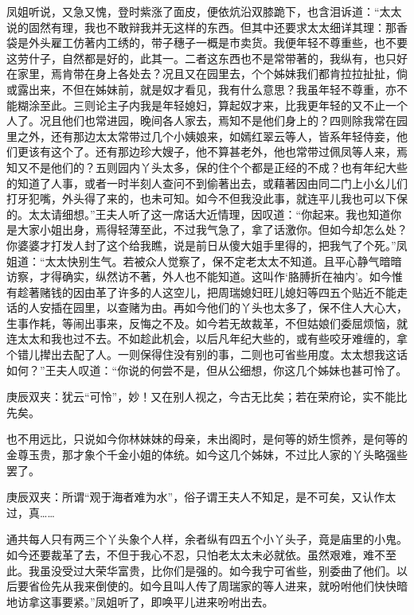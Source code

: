 \begin{parag}
    凤姐听说，又急又愧，登时紫涨了面皮，便依炕沿双膝跪下，也含泪诉道：“太太说的固然有理，我也不敢辩我并无这样的东西。但其中还要求太太细详其理：那香袋是外头雇工仿著内工绣的，带子穗子一概是市卖货。我便年轻不尊重些，也不要这劳什子，自然都是好的，此其一。二者这东西也不是常带著的，我纵有，也只好在家里，焉肯带在身上各处去？况且又在园里去，个个姊妹我们都肯拉拉扯扯，倘或露出来，不但在姊妹前，就是奴才看见，我有什么意思？我虽年轻不尊重，亦不能糊涂至此。三则论主子内我是年轻媳妇，算起奴才来，比我更年轻的又不止一个人了。况且他们也常进园，晚间各人家去，焉知不是他们身上的？四则除我常在园里之外，还有那边太太常带过几个小姨娘来，如嫣红翠云等人，皆系年轻侍妾，他们更该有这个了。还有那边珍大嫂子，他不算甚老外，他也常带过佩凤等人来，焉知又不是他们的？五则园内丫头太多，保的住个个都是正经的不成？也有年纪大些的知道了人事，或者一时半刻人查问不到偷著出去，或藉著因由同二门上小幺儿们打牙犯嘴，外头得了来的，也未可知。如今不但我没此事，就连平儿我也可以下保的。太太请细想。”王夫人听了这一席话大近情理，因叹道：“你起来。我也知道你是大家小姐出身，焉得轻薄至此，不过我气急了，拿了话激你。但如今却怎么处？你婆婆才打发人封了这个给我瞧，说是前日从傻大姐手里得的，把我气了个死。”凤姐道：“太太快别生气。若被众人觉察了，保不定老太太不知道。且平心静气暗暗访察，才得确实，纵然访不著，外人也不能知道。这叫作‘胳膊折在袖内’。如今惟有趁著赌钱的因由革了许多的人这空儿，把周瑞媳妇旺儿媳妇等四五个贴近不能走话的人安插在园里，以查赌为由。再如今他们的丫头也太多了，保不住人大心大，生事作耗，等闹出事来，反悔之不及。如今若无故裁革，不但姑娘们委屈烦恼，就连太太和我也过不去。不如趁此机会，以后凡年纪大些的，或有些咬牙难缠的，拿个错儿撵出去配了人。一则保得住没有别的事，二则也可省些用度。太太想我这话如何？”王夫人叹道：“你说的何尝不是，但从公细想，你这几个姊妹也甚可怜了。\begin{note}庚辰双夹：犹云“可怜”，妙！又在别人视之，今古无比矣；若在荣府论，实不能比先矣。\end{note}也不用远比，只说如今你林妹妹的母亲，未出阁时，是何等的娇生惯养，是何等的金尊玉贵，那才象个千金小姐的体统。如今这几个姊妹，不过比人家的丫头略强些罢了。\begin{note}庚辰双夹：所谓“观于海者难为水”，俗子谓王夫人不知足，是不可矣，又认作太过，真……\end{note}通共每人只有两三个丫头象个人样，余者纵有四五个小丫头子，竟是庙里的小鬼。如今还要裁革了去，不但于我心不忍，只怕老太太未必就依。虽然艰难，难不至此。我虽没受过大荣华富贵，比你们是强的。如今我宁可省些，别委曲了他们。以后要省俭先从我来倒使的。如今且叫人传了周瑞家的等人进来，就吩咐他们快快暗地访拿这事要紧。”凤姐听了，即唤平儿进来吩咐出去。
\end{parag}


